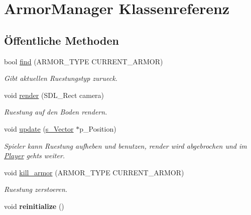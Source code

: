 \hypertarget{class_armor_manager}{\section{Armor\-Manager Klassenreferenz}
\label{class_armor_manager}
}
\subsection*{Öffentliche Methoden}
\begin{DoxyCompactItemize}
\item 
\hypertarget{class_armor_manager_ac5fa1487799e07ac40cdc4f44282c65e}{bool \hyperlink{class_armor_manager_ac5fa1487799e07ac40cdc4f44282c65e}{find} (A\-R\-M\-O\-R\-\_\-\-T\-Y\-P\-E C\-U\-R\-R\-E\-N\-T\-\_\-\-A\-R\-M\-O\-R)}\label{class_armor_manager_ac5fa1487799e07ac40cdc4f44282c65e}

\begin{DoxyCompactList}\small\item\em Gibt aktuellen Ruestungstyp zurueck. \end{DoxyCompactList}\item 
void \hyperlink{class_armor_manager_a79a20356f9630c6c51a816f0163b28bf}{render} (S\-D\-L\-\_\-\-Rect camera)
\begin{DoxyCompactList}\small\item\em Ruestung auf den Boden rendern. \end{DoxyCompactList}\item 
void \hyperlink{class_armor_manager_a6f608963c4a1efb31b2d658ee5246459}{update} (\hyperlink{structs___vector}{s\-\_\-\-Vector} $\ast$p\-\_\-\-Position)
\begin{DoxyCompactList}\small\item\em Spieler kann Ruestung aufheben und benutzen, render wird abgebrochen und im \hyperlink{class_player}{Player} gehts weiter. \end{DoxyCompactList}\item 
\hypertarget{class_armor_manager_a4ce4fd2a1570a917b844c740d3164325}{void \hyperlink{class_armor_manager_a4ce4fd2a1570a917b844c740d3164325}{kill\-\_\-armor} (A\-R\-M\-O\-R\-\_\-\-T\-Y\-P\-E C\-U\-R\-R\-E\-N\-T\-\_\-\-A\-R\-M\-O\-R)}\label{class_armor_manager_a4ce4fd2a1570a917b844c740d3164325}

\begin{DoxyCompactList}\small\item\em Ruestung zerstoeren. \end{DoxyCompactList}\item 
\hypertarget{class_armor_manager_a9ee86635d7c7087cc59cb76cbc954d80}{void {\bfseries reinitialize} ()}\label{class_armor_manager_a9ee86635d7c7087cc59cb76cbc954d80}


\end{DoxyCompactItemize}
